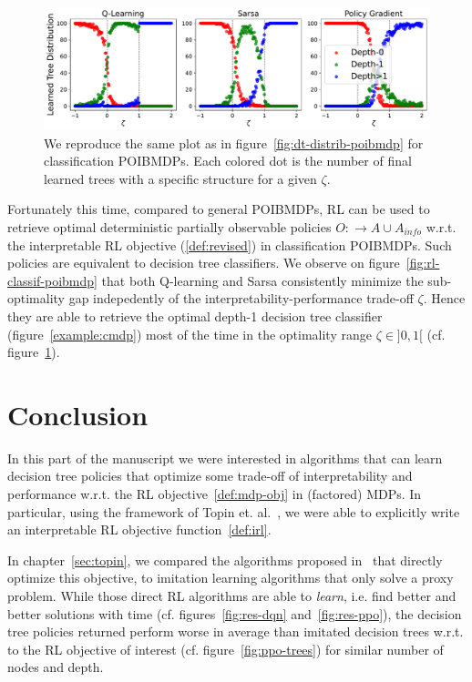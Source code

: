 \begin{figure}
    \centering
    \includegraphics[width=1\textwidth]{images/images_part1/tree_distributions_classif.pdf}
    \caption{We reproduce the same plot as in figure~\ref{fig:dt-distrib-poibmdp} for classification POIBMDPs. Each colored dot is the number of final learned trees with a specific structure for a given $\zeta$.}\label{fig:tree-distrib-classif-poibmdp}
\end{figure}

Fortunately this time, compared to general POIBMDPs, RL can be used to retrieve optimal deterministic partially observable policies $O:\rightarrow A\cup A_{info}$ w.r.t. the interpretable RL objective (\ref{def:revised}) in classification POIBMDPs.
Such policies are equivalent to decision tree classifiers.
We observe on figure~\ref{fig:rl-classif-poibmdp} that both Q-learning and Sarsa consistently minimize the sub-optimality gap indepedently of the interpretability-performance trade-off $\zeta$. 
Hence they are able to retrieve the optimal depth-1 decision tree classifier (figure~\ref{example:cmdp}) most of the time in the optimality range $\zeta\in ]0, 1[$ (cf. figure~\ref{fig:tree-distrib-classif-poibmdp}).


\section{Conclusion}\label{sec:ccl-pomdp}
In this part of the manuscript we were interested in algorithms that can learn decision tree policies that optimize some trade-off of interpretability and performance w.r.t. the RL objective~\ref{def:mdp-obj} in (factored) MDPs.
In particular, using the framework of Topin et. al.~\cite{topin2021iterative}, we were able to explicitly write an interpretable RL objective function~\ref{def:irl}.

In chapter~\ref{sec:topin}, we compared the algorithms proposed in~\cite{topin2021iterative} that directly optimize this objective, to imitation learning algorithms that only solve a proxy problem.
While those direct RL algorithms are able to \textit{learn}, i.e. find better and better solutions with time (cf. figures~\ref{fig:res-dqn} and~\ref{fig:res-ppo}), the decision tree policies returned perform worse in average than imitated decision trees w.r.t. to the RL objective of interest (cf. figure~\ref{fig:ppo-trees}) for similar number of nodes and depth.

